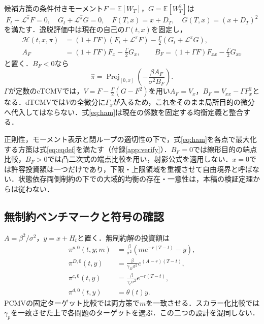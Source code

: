 \documentclass[11pt,a4paper]{article}
\numberwithin{equation}{section}
\numberwithin{table}{section}
\numberwithin{figure}{section}
\theoremstyle{plain}
\theoremstyle{definition}
\newcommand{\E}{\mathbb{E}}
\DeclareMathOperator{\Proj}{Proj}
\begin{document}
候補方策の条件付きモーメント$F=\E[W_T]$，$G=\E[W_T^2]$は
\begin{equation}
F_t+\mathcal L^{\hat\pi}F=0,\quad G_t+\mathcal L^{\hat\pi}G=0,
\quad F(T,x)=x+D_T,\quad G(T,x)=(x+D_T)^2
\label{eq:FG}
\end{equation}
を満たす．逸脱評価中は現在の自己の$\Gamma(t,x)$を固定し，
\begin{align}
\mathcal H(t,x,\pi)&=(1+\Gamma F)(F_t+\mathcal L^\pi F)-\frac\Gamma2(G_t+\mathcal L^\pi G),\label{eq:ham}\\
A_F&=(1+\Gamma F)F_x-\frac\Gamma2G_x,\qquad
B_F=(1+\Gamma F)F_{xx}-\frac\Gamma2G_{xx}
\label{eq:AB}
\end{align}
と置く．$B_F<0$なら
\begin{equation}
\hat\pi=\Proj_{[0,x]}\left(-\frac{\beta A_F}{\sigma^2B_F}\right).
\label{eq:eqproj}
\end{equation}
$\Gamma$が定数のcTCMVでは，$V=F-\tfrac\Gamma2(G-F^2)$を用い$A_F=V_x$，$B_F=V_{xx}-\Gamma F_x^2$となる．dTCMVでは$V$の全微分に$\Gamma_x$が入るため，これをそのまま局所目的の微分へ代入してはならない．式\eqref{eq:ham}は現在の係数を固定する均衡定義と整合する\citep{BjorkMurgociZhou2014,BjorkKhapkoMurgoci2017}．

正則性，モーメント表示と閉ループの適切性の下で，式\eqref{eq:ham}を各点で最大化する方策は式\eqref{eq:eqdef}を満たす（付録\ref{app:verify}）．$B_F=0$では線形目的の端点比較，$B_F>0$では凸二次式の端点比較を用い，射影公式を適用しない．$x=0$では許容投資額は一つだけであり，下限・上限領域を重複させて自由境界と呼ばない．状態依存両側制約の下での大域的均衡の存在・一意性は，本稿の検証定理からは従わない．

\subsection{無制約ベンチマークと符号の確認}
\label{sec:theta}
$A=\beta^2/\sigma^2$，$y=x+H_t$と置く．無制約解の投資額は
\begin{align}
\pi^{p,0}(t,y;m)&=\frac\beta{\sigma^2}(me^{-r(T-t)}-y),\label{eq:uncp}\\
\pi^{D,0}(t,y)&=\frac\beta{\gamma_D\sigma^2}e^{(A-r)(T-t)},\label{eq:uncD}\\
\pi^{c,0}(t,y)&=\frac\beta{\gamma_c\sigma^2}e^{-r(T-t)},\label{eq:uncc}\\
\pi^{d,0}(t,y)&=\theta(t)y.
\label{eq:uncd}
\end{align}
PCMVの固定ターゲット比較では両方策で$m$を一致させる．スカラー化比較では$\gamma_p$を一致させた上で各問題のターゲットを選ぶ．この二つの設計を混同しない．
\end{document}
